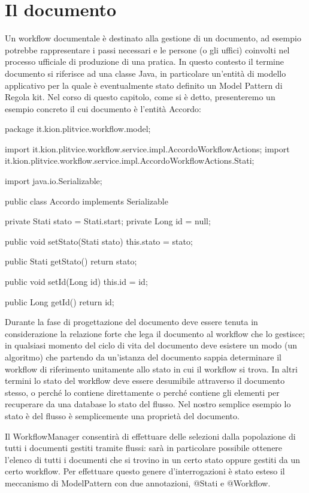 \section{Il documento}
Un workflow documentale è destinato alla gestione di un documento, ad esempio potrebbe rappresentare i passi necessari e le persone (o gli uffici) coinvolti nel processo ufficiale di produzione di una pratica. 
In questo contesto il termine documento si riferisce ad  una classe Java, in particolare  un'entità di modello applicativo per la quale è eventualmente stato definito un  Model Pattern di Regola kit. Nel corso di questo capitolo, come si è detto, presenteremo un esempio concreto il cui documento è  l'entità Accordo:

\begin{java}
package it.kion.plitvice.workflow.model;

import it.kion.plitvice.workflow.service.impl.AccordoWorkflowActions;
import it.kion.plitvice.workflow.service.impl.AccordoWorkflowActions.Stati;

import java.io.Serializable;

public class Accordo implements Serializable {

  private Stati stato = Stati.start;
  private Long id = null;
  
  public void setStato(Stati stato) {
    this.stato = stato;
  }

  public Stati getStato() {
    return stato;
  }

  public void setId(Long id) {
    this.id = id;
  }

  public Long getId() {
    return id;
  }
  
}
\end{java}

Durante la fase di progettazione del documento deve essere tenuta in considerazione la relazione forte che lega  il documento al workflow che lo gestisce; in qualsiasi momento del ciclo di vita del documento deve esistere un modo (un algoritmo)  che partendo da un'istanza del documento sappia determinare il workflow di riferimento unitamente allo stato in cui il workflow si trova.  In altri termini lo stato del workflow deve essere desumibile attraverso il documento stesso, o perché lo contiene direttamente  o perché contiene gli elementi per recuperare da una database lo stato del flusso. 
Nel nostro semplice esempio lo stato è del flusso è semplicemente una proprietà del documento.

Il WorkflowManager consentirà di effettuare delle selezioni dalla popolazione di tutti i documenti gestiti tramite flussi: sarà in particolare possibile ottenere l'elenco di tutti i documenti che si trovino in un certo stato oppure gestiti da un certo workflow. Per effettuare questo genere d'interrogazioni è stato esteso il meccanismo di ModelPattern con due annotazioni, @Stati e @Workflow.

